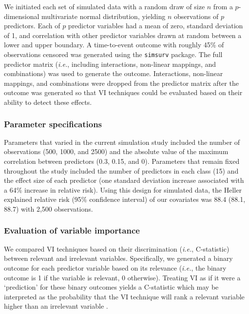 \documentclass{article}\usepackage[]{graphicx}\usepackage[]{xcolor}
\newcommand{\ie}{\textit{i.e.}}
\begin{document}
We initiated each set of simulated data with a random draw of size $n$ from a $p$-dimensional multivariate normal distribution, yielding $n$ observations of $p$ predictors. Each of $p$ predictor variables had a mean of zero, standard deviation of 1, and correlation with other predictor variables drawn at random between a lower and upper boundary. A time-to-event outcome with roughly 45\% of observations censored was generated using the \texttt{simsurv} package. The full predictor matrix (\ie, including interactions, non-linear mappings, and combinations) was used to generate the outcome. Interactions, non-linear mappings, and combinations were dropped from the predictor matrix after the outcome was generated so that VI techniques could be evaluated based on their ability to detect these effects.

\subsubsection{Parameter specifications}




Parameters that varied in the current simulation study included the number of observations (500, 1000, and 2500) and the absolute value of the maximum correlation between predictors (0.3, 0.15, and 0). Parameters that remain fixed throughout the study included the number of predictors in each class (15) and the effect size of each predictor (one standard deviation increase associated with a 64\% increase in relative risk). Using this design for simulated data, the Heller explained relative risk (95\% confidence interval) of our covariates was 88.4 (88.1, 88.7) \citep{heller2012measure} with 2,500 observations.

\subsubsection{Evaluation of variable importance}

We compared VI techniques based on their discrimination (\ie, C-statistic) between relevant and irrelevant variables. Specifically, we generated a binary outcome for each predictor variable based on its relevance (\ie, the binary outcome is 1 if the variable is relevant, 0 otherwise). Treating VI as if it were a ‘prediction’ for these binary outcomes yields a C-statistic which may be interpreted as the probability that the VI technique will rank a relevant variable higher than an irrelevant variable \citep{harrell1982evaluating}.
\end{document}

